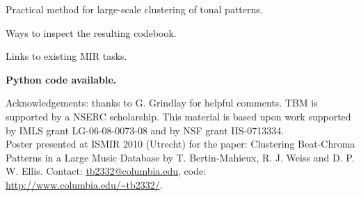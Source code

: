 \documentclass[portrait,a0b,final]{a0poster}
\newenvironment{poster}{
  \begin{center}
  \begin{minipage}[c]{0.98\textwidth}
}{
  \end{minipage} 
  \end{center}
}
\newcommand{\myfig}[3][0]{
\begin{center}
  \vspace{1.5cm}
  \texttt{[image: \#2]}
  \nobreak\medskip
\end{center}}
\begin{document}
\begin{poster}
\begin{multicols}{3}
\vspace{1.0cm}

\begin{list}{}{\leftmargin=2em =1em}
\item Practical method for large-scale clustering of tonal patterns.
\item Ways to inspect the resulting codebook.
\item Links to existing MIR tasks.
\item \textbf{Python code available.}
\end{list}

\end{multicols}

\vspace{1cm}
\begin{minipage}{\textwidth}
\begin{small}
\begin{flushright}
Acknowledgements: thanks to G. Grindlay for
helpful comments. TBM is supported by a
NSERC scholarship. This material is based upon work
supported by IMLS grant LG-06-08-0073-08 and by NSF
grant IIS-0713334. \\
Poster presented at ISMIR 2010 (Utrecht) for the paper:
Clustering Beat-Chroma Patterns in a Large Music Database by
T. Bertin-Mahieux, R. J. Weiss and D. P. W. Ellis. Contact:
\url{tb2332@columbia.edu}, code: \url{http://www.columbia.edu/~tb2332/}.
\end{flushright}
\end{small}
\end{minipage}

\end{poster}
\end{document}
